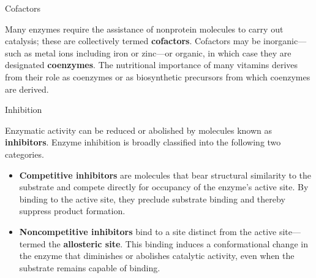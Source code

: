 \documentclass[10pt]{article}
\begin{document}
    \begin{core}{Cofactors}

      Many enzymes require the assistance of nonprotein molecules to carry out catalysis; these are collectively termed \textbf{cofactors}. Cofactors may be inorganic---such as metal ions including iron or zinc---or organic, in which case they are designated \textbf{coenzymes}. The nutritional importance of many vitamins derives from their role as coenzymes or as biosynthetic precursors from which coenzymes are derived.


    \end{core}

    \begin{core}{Inhibition}

      Enzymatic activity can be reduced or abolished by molecules known as \textbf{inhibitors}. Enzyme inhibition is broadly classified into the following two categories.


      \begin{itemize}

        \item \textbf{Competitive inhibitors} are molecules that bear structural similarity to the substrate and compete directly for occupancy of the enzyme's active site. By binding to the active site, they preclude substrate binding and thereby suppress product formation.

        \item \textbf{Noncompetitive inhibitors} bind to a site distinct from the active site---termed the \textbf{allosteric site}. This binding induces a conformational change in the enzyme that diminishes or abolishes catalytic activity, even when the substrate remains capable of binding.

      \end{itemize}

    \end{core}
\end{document}
